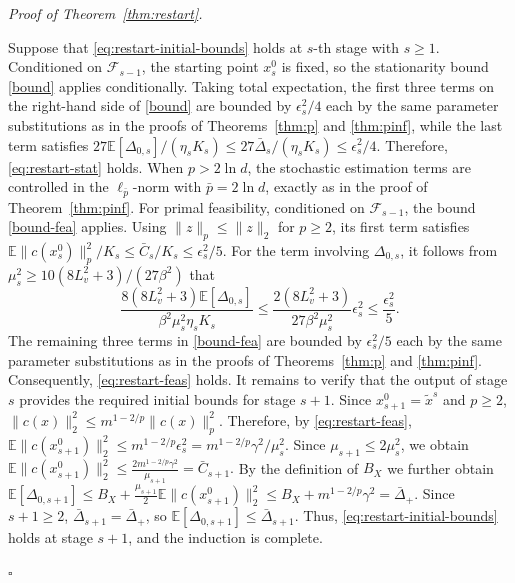 \documentclass[11pt]{article}
\newenvironment{proof}[1][Proof]{%
    \par\noindent\textit{#1.}\enspace
  }{%
    \hfill\ensuremath{\square}\par
  }%
\numberwithin{equation}{section}
\begin{document}
\begin{proof}[Proof of Theorem~\ref{thm:restart}]
Suppose that \eqref{eq:restart-initial-bounds} holds at \(s\)-th stage with $s\ge1$. Conditioned on \(\mathcal F_{s-1}\), the starting point \(x_s^0\) is fixed, so the stationarity bound \eqref{bound} applies conditionally. Taking total expectation, the first three terms on the right-hand side of \eqref{bound} are bounded by \(\epsilon_s^2/4\) each by the same parameter substitutions as in the proofs of Theorems~\ref{thm:p} and \ref{thm:pinf}, while the last term satisfies \(27\mathbb E[\Delta_{0,s}]/(\eta_sK_s)\le27\bar\Delta_s/(\eta_sK_s)\le\epsilon_s^2/4\). Therefore, \eqref{eq:restart-stat} holds. When \(p>2\ln d\), the stochastic estimation terms are controlled in the \(\ell_{\bar p}\)-norm with \(\bar p=2\ln d\), exactly as in the proof of Theorem~\ref{thm:pinf}.
For primal feasibility, conditioned on \(\mathcal F_{s-1}\), the bound \eqref{bound-fea} applies. Using \(\|z\|_p\le\|z\|_2\) for \(p\ge2\), its first term satisfies \(\mathbb E\|c(x_s^0)\|_p^2/K_s\le\bar C_s/K_s\le\epsilon_s^2/5\). For the term involving \(\Delta_{0,s}\), it follows from  \(\mu_s^2\ge10(8L_v^2+3)/(27\beta^2)\) that 
\[
\frac{8(8L_v^2+3)\mathbb E[\Delta_{0,s}]}{\beta^2\mu_s^2\eta_sK_s}
\le
\frac{2(8L_v^2+3)}{27\beta^2\mu_s^2}\epsilon_s^2
\le
\frac{\epsilon_s^2}{5}.
\]
 The remaining three terms in \eqref{bound-fea} are bounded by \(\epsilon_s^2/5\) each by the same parameter substitutions as in the proofs of Theorems~\ref{thm:p} and \ref{thm:pinf}. Consequently, \eqref{eq:restart-feas} holds.
It remains to verify that the output of stage \(s\) provides the required initial bounds for stage \(s+1\). Since \(x_{s+1}^0=\tilde x^s\)  and \(p\ge2\), \(\|c(x)\|_2^2\le m^{1-2/p}\|c(x)\|_p^2\). Therefore, by \eqref{eq:restart-feas}, \(\mathbb E\|c(x_{s+1}^0)\|_2^2\le m^{1-2/p}\epsilon_s^2=m^{1-2/p}\gamma^2/\mu_s^2\). Since \(\mu_{s+1}\le2\mu_s^2\), we obtain 
\(%
\mathbb E\|c(x_{s+1}^0)\|_2^2
\le\frac{2m^{1-2/p}\gamma^2}{\mu_{s+1}}
=\bar C_{s+1}.
\) %
By the definition of \(B_X\) we further obtain 
\(\mathbb E[\Delta_{0,s+1}]
\le B_X+\frac{\mu_{s+1}}{2}\mathbb E\|c(x_{s+1}^0)\|_2^2
\le B_X+m^{1-2/p}\gamma^2
=\bar\Delta_+.\)
Since \(s+1\ge2\), \(\bar\Delta_{s+1}=\bar\Delta_+\), so \(\mathbb E[\Delta_{0,s+1}]\le\bar\Delta_{s+1}\). Thus, \eqref{eq:restart-initial-bounds} holds at stage \(s+1\), and the induction is complete.


\end{proof}
\end{document}
